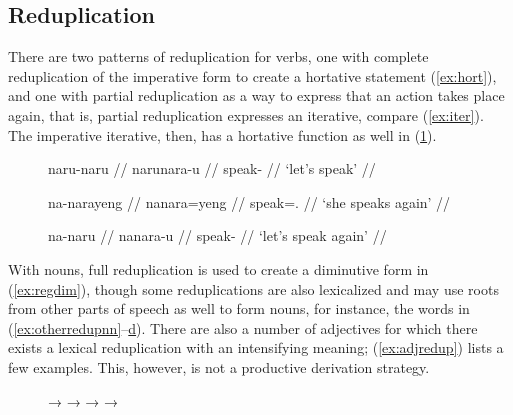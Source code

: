 
\subsection{Reduplication}
\label{subsec:reduplication}

There are two patterns of reduplication for verbs, one with complete
reduplication of the imperative form to create a hortative statement
(\ref{ex:hort}), and one with partial reduplication as a way to express that an
action takes place again, that is, partial reduplication expresses an
iterative, compare (\ref{ex:iter}). The imperative iterative, then, has a
hortative function as well in (\ref{ex:hort+iter}).

\begin{figure}[h]
\pex
\a\label{ex:hort}\begingl%
	\gla naru-naru //
	\glb naru\til{}nara-u //
	\glc \Hort{}\til{}speak-\Imp{} //
	\glft `let's speak' //
\endgl

\a\label{ex:iter}\begingl
	\gla na-narayeng //
	\glb na\til{}nara=yeng //
	\glc \Iter{}\til{}speak=\TsgF{}.\Aarg{} //
	\glft `she speaks again' //
\endgl

\a\label{ex:hort+iter}\begingl
	\gla na-naru //
	\glb na\til{}nara-u //
	\glc \Iter{}\til{}speak-\Imp{} //
	\glft `let's speak again' //
\endgl
\xe
\end{figure}

With nouns, full reduplication is used to create a diminutive
form in (\ref{ex:regdim}), though some reduplications are also lexicalized and
may use roots from other parts of speech as well to form nouns, for instance,
the words in (\ref{ex:otherredupnn}--\hyperref[ex:otherredupvb]{d}). There are
also a number of adjectives for which there exists a lexical reduplication with
an intensifying meaning; (\ref{ex:adjredup}) lists a few examples. This,
however, is not a productive derivation strategy.

\begin{figure}[h]
\pex
	\a {}
		→ \label{ex:regdim}
	\a {}
		→ %
			\label{ex:otherredupnn}
	\a {}
		→  
			\label{ex:otherredupadj}
	\a {} → 
			\label{ex:otherredupvb}
\xe
\end{figure}

